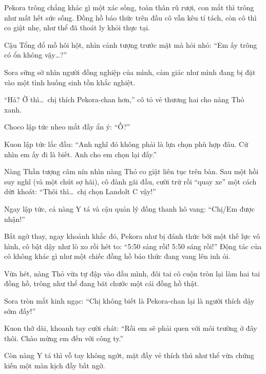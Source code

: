 \documentclass[../main.tex]{subfiles}
\begin{document}
Pekora trông chẳng khác gì một xác sống, toàn thân rũ rượi, con mắt thì trông như mất hết sức sống. Đồng hồ báo thức trên đầu cô vẫn kêu tí tách, còn cô thì co giật nhẹ, như thể đã thoát ly khỏi thực tại.


Cậu Tổng đổ mồ hôi hột, nhìn cảnh tượng trước mặt mà hỏi nhỏ: ``Em ấy trông có ổn không vậy\dots?''

Sora sững sờ nhìn người đồng nghiệp của mình, cảm giác như mình đang bị đặt vào một tình huống sinh tồn khắc nghiệt.

``Hả? Ờ thì\dots\ chị thích Pekora-chan hơn,'' cô tỏ vẻ thương hai cho nàng Thỏ xanh.

Choco lập tức nheo mắt đầy ẩn ý: ``Ồ?''

Kuon lập tức lắc đầu: ``Anh nghĩ đó không phải là lựa chọn phù hợp đâu. Cứ nhìn em ấy đi là biết. Anh cho em chọn lại đấy.''

Nàng Thần tượng câm nín nhìn nàng Thỏ co giật liên tục trên bàn. Sau một hồi suy nghĩ (và một chút sợ hãi), cô đành gãi đầu, cười trừ rồi ``quay xe'' một cách dứt khoát: ``Thôi thì\dots\ chị chọn Landolt C vậy!''

Ngay lập tức, cả nàng Y tá và cậu quản lý đồng thanh hô vang: ``Chị/Em được nhận!''

Bất ngờ thay, ngay khoảnh khắc đó, Pekora như bị đánh thức bởi một thế lực vô hình, cô bật dậy như lò xo rồi hét to: ``5:50 sáng rồi! 5:50 sáng rồi!'' Động tác của cô không khác gì như một chiếc đồng hồ báo thức đang vang lên inh ỏi.


Vừa hét, nàng Thỏ vừa tự đập vào đầu mình, đôi tai cô cuộn tròn lại làm hai tai đồng hồ, trông như thể đang băt chước một cái đồng hồ thật.

Sora tròn mắt kinh ngạc: ``Chị không biết là Pekora-chan lại là người thích dậy sớm đấy!''

Kuon thở dài, khoanh tay cười chát: ``Rồi em sẽ phải quen với môi trường ở đây thôi. Chào mừng em đến với công ty.''

Còn nàng Y tá thì vỗ tay không ngớt, mặt đầy vẻ thích thú như thể vừa chứng kiến một màn kịch đầy bất ngờ.

\subsection*{\label{ep-S13.III}}
\end{document}
